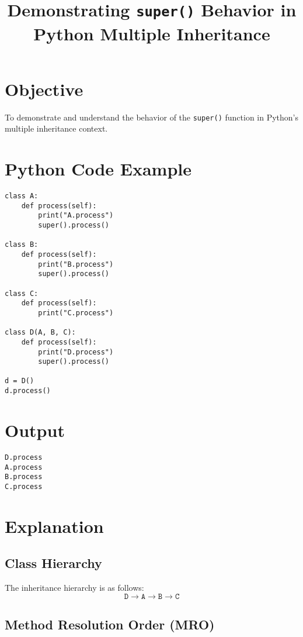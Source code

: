 \documentclass{article}
\title{Demonstrating \texttt{super()} Behavior in Python Multiple Inheritance}
\author{}
\date{}
\begin{document}
\maketitle

\section*{Objective}
To demonstrate and understand the behavior of the \texttt{super()} function in Python's multiple inheritance context.

\section*{Python Code Example}
\begin{lstlisting}
class A:
    def process(self):
        print("A.process")
        super().process()

class B:
    def process(self):
        print("B.process")
        super().process()

class C:
    def process(self):
        print("C.process")

class D(A, B, C):
    def process(self):
        print("D.process")
        super().process()

d = D()
d.process()
\end{lstlisting}

\section*{Output}
\begin{lstlisting}
D.process
A.process
B.process
C.process
\end{lstlisting}

\section*{Explanation}

\subsection*{Class Hierarchy}

The inheritance hierarchy is as follows:
\[
\texttt{D} \rightarrow \texttt{A} \rightarrow \texttt{B} \rightarrow \texttt{C}
\]

\subsection*{Method Resolution Order (MRO)}
\end{document}

